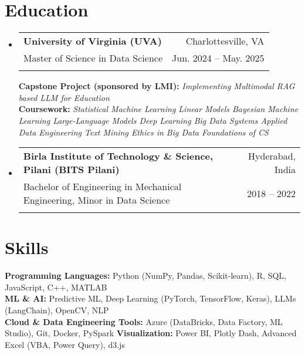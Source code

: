 \documentclass[letter paper,11pt]{article}
\makeatletter
\newcommand{\resumeSubheading}[5]{%
  \item
    \begin{tabular*}
    {1\textwidth}
    {l@{\extracolsep{\fill}}r}
      \textbf{#1} & \small#2 \\
      {\small#3} & {\small #4} \\
      {\small#5}
    \end{tabular*}%
  \vspace{-0.95cm}
}
\newcommand{\resumeSubHeadingListStart}{\begin{itemize}[leftmargin=0.0in, label={}]}
\newcommand{\resumeSubHeadingListEnd}{\end{itemize}}
\makeatother
\begin{document}
\vspace{1pt}
\section{Education}
    \resumeSubHeadingListStart
    
    \resumeSubheading
         {University of Virginia (UVA)}{Charlottesville, VA}
        {Master of Science in Data Science}{Jun. 2024 -- May. 2025}{}
        
        \vspace{7pt}
        
        \footnotesize{\textbf{Capstone Project (sponsored by LMI):} \textit{Implementing Multimodal RAG based LLM for Education} \\
        \textbf{Coursework:}
        \textit{Statistical Machine Learning \textbullet{} 
        Linear Models \textbullet{} 
        Bayesian Machine Learning \textbullet{} 
        Large-Language Models \textbullet{}
        Deep Learning \textbullet{}
        Big Data Systems \textbullet{} 
        Applied Data Engineering \textbullet{}
        Text Mining \textbullet{} 
        Ethics in Big Data \textbullet{} 
        Foundations of CS 
        }}

    
    \vspace{1pt}    
    \resumeSubheading
        {\small{Birla Institute of Technology \& Science, Pilani (BITS Pilani)}}{Hyderabad, India}
        {Bachelor of Engineering in Mechanical Engineering, Minor in Data Science}{2018 -- 2022}{}
    \vspace{5pt}

 \resumeSubHeadingListEnd 
%



 


\section{Skills}
 \begin{itemize}[leftmargin=0.00in, label={}]
    \small{\item{
     \textbf{Programming Languages:}{ Python (NumPy, Pandas, Scikit-learn), R, SQL, JavaScript, C++, MATLAB} \\
     \textbf{ML \& AI:}{ Predictive ML, Deep Learning (PyTorch, TensorFlow, Keras), LLMs (LangChain), OpenCV, NLP  } \\
     \textbf{Cloud \& Data Engineering Tools:}{ Azure (DataBricks, Data Factory, ML Studio), Git, Docker, PySpark}
     \textbf{Visualization:}{ Power BI, Plotly Dash, Advanced Excel (VBA, Power Query), d3.js} \
    }}
 \end{itemize}
 \vspace{-15pt}
\end{document}
